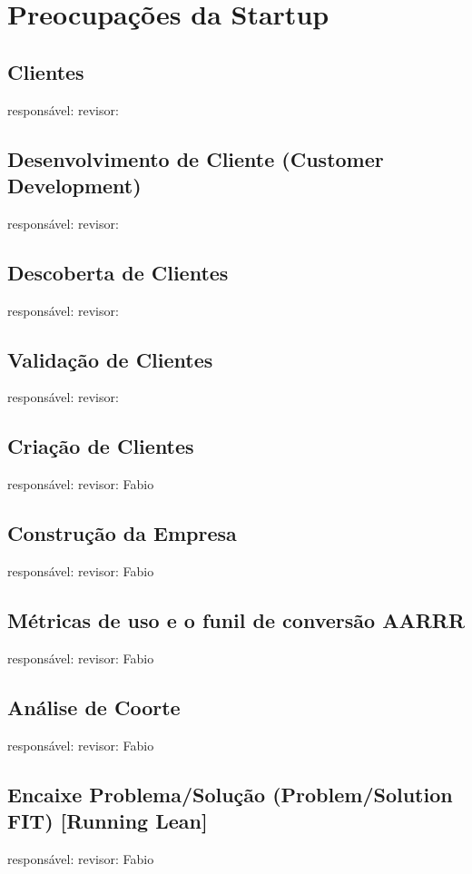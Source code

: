 \section{Preocupações da Startup}

\subsection{Clientes}
responsável: revisor:

\subsection{Desenvolvimento de Cliente (Customer Development)}
responsável: revisor:


\subsection{Descoberta de Clientes}
responsável: revisor:

\subsection{Validação de Clientes}
responsável: revisor:

\subsection{Criação de Clientes}
responsável: revisor: Fabio

\subsection{Construção da Empresa}
responsável: revisor: Fabio

\subsection{Métricas de uso e o funil de conversão AARRR}
responsável: revisor: Fabio

\subsection{Análise de Coorte}
responsável: revisor: Fabio

\subsection{Encaixe Problema/Solução (Problem/Solution FIT) [Running Lean]}
responsável: revisor: Fabio
